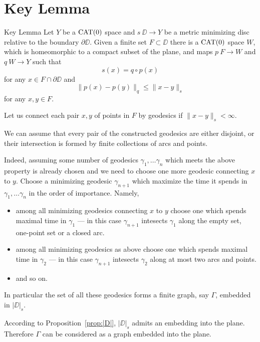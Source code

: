 \documentclass[a4paper,10pt]{amsart}
\begin{document}
\section{Key Lemma}


\begin{thm}{Key Lemma}\label{lem:key}
Let $Y$ be a $\mathop{\rm CAT}\nolimits(0)$ space and $s\:\DD\to Y$ 
be a metric minimizing disc relative to the boundary $\partial \DD$.
Given a finite set $F\subset \DD$
there is a $\mathop{\rm CAT}\nolimits(0)$ space $W$, which is homeomorphic to a compact subset of the plane,
and maps $p\:F\to W$ and $q\:W\to Y$ such that
\[s(x)=q\circ p(x)\] 
for any $x\in F\cap \partial \DD$
and 
\[\|p(x)-p(y)\|_q\le \|x-y\|_s\] 
for any $x,y\in F$.
\end{thm}

Let us connect each pair $x,y$ of points in $F$ by geodesics
if $\|x-y\|_s<\infty$.

We can assume that 
every pair of the constructed geodesics 
are either disjoint, or their intersection is formed by finite collections of arcs and points.

Indeed, assuming some number of geodesics $\gamma_1,\dots\gamma_n$ which meets the above property is already chosen and we need to choose one more geodesic connecting $x$ to $y$.
Choose a minimizing geodesic $\gamma_{n+1}$ which maximize the time it spends in $\gamma_1,\dots\gamma_n$  in the order of importance.
Namely, 
\begin{itemize}
\item  among all minimizing geodesics connecting $x$ to $y$
choose one which spends maximal time in $\gamma_1$ --- in this case $\gamma_{n+1}$ intesects $\gamma_1$ along the empty set, one-point set or a closed arc.
\item among all minimizing geodesics as above
choose one which spends maximal time in $\gamma_2$ --- in this case $\gamma_{n+1}$ intesects $\gamma_2$ along at most two arcs and points.
\item and so on.
\end{itemize}


In particular the set of all these geodesics forms a finite graph, say $\Gamma$,
embedded in $|\DD|_s$. 

According to Proposition~\ref{prop:|D|},
$|\DD|_s$ admits an embedding into the plane.
Therefore $\Gamma$ can be considered as a graph embedded into the plane.
\end{document}
